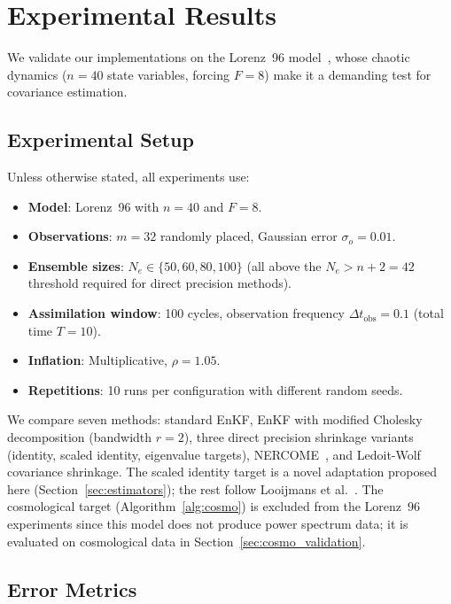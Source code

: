 \section{Experimental Results}
\label{sec:results}

We validate our implementations on the Lorenz~96 model~\cite{lorenz1996predictability}, whose chaotic dynamics ($n = 40$ state variables, forcing $F = 8$) make it a demanding test for covariance estimation.

\subsection{Experimental Setup}
\label{sec:setup}

Unless otherwise stated, all experiments use:
\begin{itemize}
    \item \textbf{Model}: Lorenz~96 with $n = 40$ and $F = 8$.
    \item \textbf{Observations}: $m = 32$ randomly placed, Gaussian error $\sigma_o = 0.01$.
    \item \textbf{Ensemble sizes}: $N_e \in \{50, 60, 80, 100\}$ (all above the $N_e > n + 2 = 42$ threshold required for direct precision methods).
    \item \textbf{Assimilation window}: 100 cycles, observation frequency $\Delta t_{\text{obs}} = 0.1$ (total time $T = 10$).
    \item \textbf{Inflation}: Multiplicative, $\rho = 1.05$.
    \item \textbf{Repetitions}: 10 runs per configuration with different random seeds.
\end{itemize}

We compare seven methods: standard EnKF, EnKF with modified Cholesky decomposition (bandwidth $r = 2$), three direct precision shrinkage variants (identity, scaled identity, eigenvalue targets), NERCOME~\cite{joachimi2017non}, and Ledoit-Wolf covariance shrinkage. The scaled identity target is a novel adaptation proposed here (Section~\ref{sec:estimators}); the rest follow Looijmans et al.~\cite{looijmans2024comparison}. The cosmological target (Algorithm~\ref{alg:cosmo}) is excluded from the Lorenz~96 experiments since this model does not produce power spectrum data; it is evaluated on cosmological data in Section~\ref{sec:cosmo_validation}.

\subsection{Error Metrics}
\label{sec:metrics}

